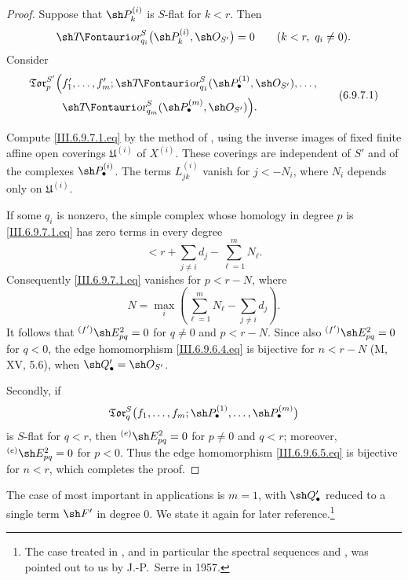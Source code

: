\begin{proof}
Suppose that $\sh P_k^{(i)}$ is $S$-flat for $k<r$.  Then
\[
  \shTor_{q_i}^S
  \bigl(
    \sh P_k^{(i)},\sh O_{S'}
  \bigr)
  =
  0
  \qquad
  (k<r,\ q_i\neq0).
\]
Consider
\[
\begin{split}
  \mathfrak{Tor}_p^{S'}
  \Bigl(
    &
    f_1',\ldots,f_m';
    \shTor_{q_1}^S
    (\sh P_\bullet^{(1)},\sh O_{S'}),\ldots,
    \\
    &
    \shTor_{q_m}^S
    (\sh P_\bullet^{(m)},\sh O_{S'})
  \Bigr).
\end{split}
  \tag{6.9.7.1}\label{III.6.9.7.1.eq}
\]


Compute \eqref{III.6.9.7.1.eq} by the method of
, using the inverse images of fixed finite affine
open coverings $\mathfrak U^{(i)}$ of $X^{(i)}$.  These coverings
are independent of $S'$ and of the complexes
$\sh P_\bullet^{(i)}$.  The terms $L_{jk}^{(i)}$ vanish for
$j<-N_i$, where $N_i$ depends only on $\mathfrak U^{(i)}$.

If some $q_i$ is nonzero, the simple complex whose homology in
degree $p$ is \eqref{III.6.9.7.1.eq} has zero terms in every degree
\[
  <
  r+\sum_{j\neq i}d_j-\sum_{\ell=1}^mN_\ell.
\]
Consequently \eqref{III.6.9.7.1.eq} vanishes for $p<r-N$, where
\[
  N
  =
  \max_i
  \left(
    \sum_{\ell=1}^mN_\ell-\sum_{j\neq i}d_j
  \right).
\]
It follows that
${}^{(f')}\sh E_{pq}^2=0$ for $q\neq0$ and $p<r-N$.
Since also ${}^{(f')}\sh E_{pq}^2=0$ for $q<0$, the edge
homomorphism \eqref{III.6.9.6.4.eq} is bijective for $n<r-N$
(M, XV, 5.6), when $\sh Q_\bullet'=\sh O_{S'}$.

Secondly, if
\[
  \mathfrak{Tor}_q^S
  \bigl(
    f_1,\ldots,f_m;
    \sh P_\bullet^{(1)},\ldots,\sh P_\bullet^{(m)}
  \bigr)
\]
is $S$-flat for $q<r$, then
${}^{(e)}\sh E_{pq}^2=0$ for $p\neq0$ and $q<r$; moreover,
${}^{(e)}\sh E_{pq}^2=0$ for $p<0$.  Thus the edge homomorphism
\eqref{III.6.9.6.5.eq} is bijective for $n<r$, which completes the
proof.
\end{proof}

The case of  most important in applications is
$m=1$, with $\sh Q_\bullet'$ reduced to a single term $\sh F'$ in
degree $0$.  We state it again for later reference.\footnote{The
case treated in , and in particular the spectral
sequences  and , was pointed
out to us by J.-P.~Serre in 1957.}

